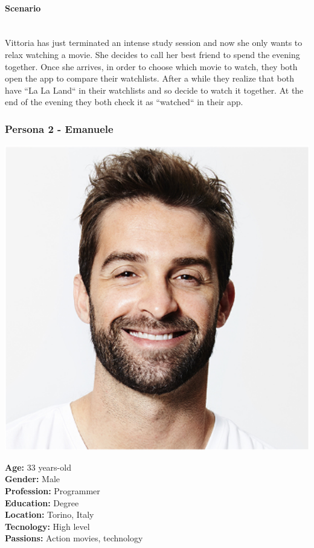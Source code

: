 \documentclass[12pt, a4paper]{article}
\numberwithin{figure}{section}
\begin{document}
\paragraph{Scenario}\mbox{}\\
Vittoria has just terminated an intense study session and now she only wants to
relax watching a movie. She decides to call her best friend to spend the evening together.
Once she arrives, in order to choose which movie to watch, they both open the app to
compare their watchlists. After a while they realize that both have “La La Land“ in their
watchlists and so decide to watch it together.
At the end of the evening they both check it as “watched“ in their app.

\subsubsection{Persona 2 - Emanuele}

\begin{minipage}{0.3\textwidth}
	\includegraphics[width=1\textwidth]{images/emanuele.png}
\end{minipage}
\hspace{0.02\linewidth}
\begin{minipage}{0.65\textwidth}
	\textbf{Age:} 33 years-old\\
	\textbf{Gender:} Male\\
	\textbf{Profession:} Programmer\\
	\textbf{Education:} Degree\\
	\textbf{Location:} Torino, Italy\\
	\textbf{Tecnology:} High level\\
	\textbf{Passions:} Action movies, technology\\
\end{minipage}
\end{document}
